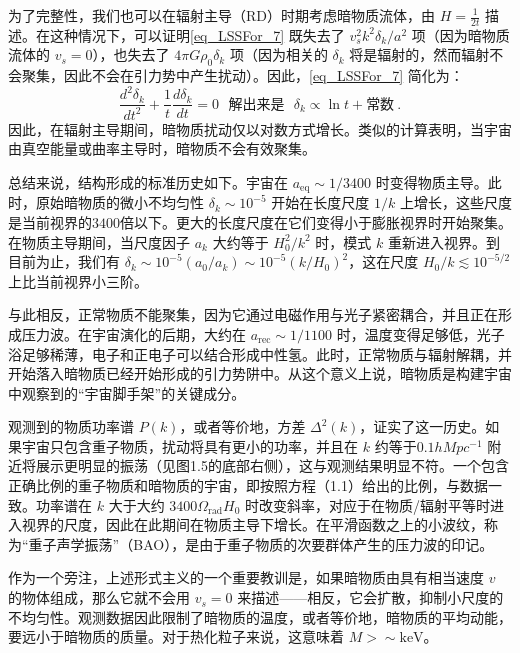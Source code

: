 为了完整性，我们也可以在辐射主导（RD）时期考虑暗物质流体，由 \( H = \frac{1}{2t} \) 描述。在这种情况下，可以证明\autoref{eq_LSSFor_7} 既失去了 \( v_s^2 k^2 \delta_k/a^2 \) 项（因为暗物质流体的 \( v_s = 0 \)），也失去了 \( 4\pi G \rho_0 \delta_k \) 项（因为相关的 \( \delta_k \) 将是辐射的，然而辐射不会聚集，因此不会在引力势中产生扰动）。因此，\autoref{eq_LSSFor_7} 简化为：
\[ \frac{d^2 \delta_k}{dt^2} + \frac{1}{t} \frac{d \delta_k}{dt} = 0 \,\,\,\,\text{解出来是} \,\,\,\,\delta_k \propto \ln t+\text{常数}  ~. \]
因此，在辐射主导期间，暗物质扰动仅以对数方式增长。类似的计算表明，当宇宙由真空能量或曲率主导时，暗物质不会有效聚集。

总结来说，结构形成的标准历史如下。宇宙在 \( a_{\text{eq}} \sim 1/3400 \) 时变得物质主导。此时，原始暗物质的微小不均匀性 \( \delta_k \sim 10^{-5} \) 开始在长度尺度 \( 1/k \) 上增长，这些尺度是当前视界的$3400$倍以下。更大的长度尺度在它们变得小于膨胀视界时开始聚集。在物质主导期间，当尺度因子 \( a_k \) 大约等于 \( H_0^2 / k^2 \) 时，模式 \( k \) 重新进入视界。到目前为止，我们有 \( \delta_k \sim 10^{-5}(a_0/a_k) \sim 10^{-5}(k/H_0)^2 \)，这在尺度 \( H_0/k \lesssim 10^{-5/2} \) 上比当前视界小三阶。

与此相反，正常物质不能聚集，因为它通过电磁作用与光子紧密耦合，并且正在形成压力波。在宇宙演化的后期，大约在 \( a_{\text{rec}} \sim 1/1100 \) 时，温度变得足够低，光子浴足够稀薄，电子和正电子可以结合形成中性氢。此时，正常物质与辐射解耦，并开始落入暗物质已经开始形成的引力势阱中。从这个意义上说，暗物质是构建宇宙中观察到的“宇宙脚手架”的关键成分。

观测到的物质功率谱 \( P(k) \)，或者等价地，方差 \( \Delta^2(k) \)，证实了这一历史。如果宇宙只包含重子物质，扰动将具有更小的功率，并且在 \( k \) 约等于$0.1 h Mpc^{-1}$ 附近将展示更明显的振荡（见图1.5的底部右侧），这与观测结果明显不符。一个包含正确比例的重子物质和暗物质的宇宙，即按照方程（1.1）给出的比例，与数据一致。功率谱在 \( k \) 大于大约 \( 3400 \Omega_{\text{rad}} H_0 \) 时改变斜率，对应于在物质/辐射平等时进入视界的尺度，因此在此期间在物质主导下增长。在平滑函数之上的小波纹，称为“重子声学振荡”（BAO），是由于重子物质的次要群体产生的压力波的印记。

作为一个旁注，上述形式主义的一个重要教训是，如果暗物质由具有相当速度 \( v \) 的物体组成，那么它就不会用 \( v_s = 0 \) 来描述——相反，它会扩散，抑制小尺度的不均匀性。观测数据因此限制了暗物质的温度，或者等价地，暗物质的平均动能，要远小于暗物质的质量。对于热化粒子来说，这意味着 \( M > \sim \text{keV} \)。









 

